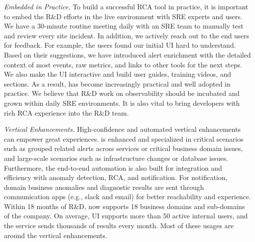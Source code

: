 \emph{Embedded in Practice.} To build a successful RCA tool in practice, it is important to embed the R\&D efforts in the live environment with SRE experts and users. We have a 30-minute routine meeting daily with an SRE team to manually test and review every site incident. In addition, we actively reach out to the end users for feedback. For example, the users found our initial UI hard to understand. Based on their suggestions, we have introduced alert enrichment with the detailed context of most events, raw metrics, and links to other tools for the next steps. We also make the UI interactive and build user guides, training videos, and sections. As a result, \system has become increasingly practical and well adopted in practice. We believe that R\&D work on observability should be incubated and grown within daily SRE environments. It is also vital to bring developers with rich RCA experience into the R\&D team.

\emph{Vertical Enhancements.} High-confidence and automated vertical enhancements can empower great experiences. \system is enhanced and specialized in critical scenarios such as grouped related %
alerts across services or critical business domain issues, and large-scale scenarios such as infrastructure changes or database issues. Furthermore, the end-to-end automation is also built for integration and efficiency with anomaly detection, RCA, and notification. For notification, domain business anomalies and diagnostic results are sent through communication apps (e.g., slack and email) for better reachability and experience. Within 18 months of R\&D, \system now supports 18 business domains and sub-domains of the company. On average, \system UI supports more than 50 active internal users, and the service sends thousands of results every month. Most of these usages are around the vertical enhancements. 



